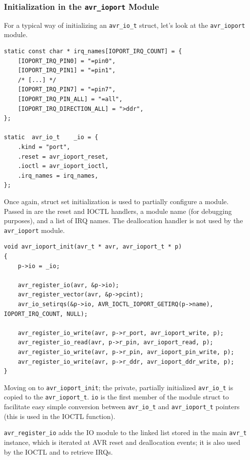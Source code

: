 \subsubsection{Initialization in the \lstinline|avr_ioport| Module}

For a typical way of initializing an \lstinline|avr_io_t| struct, let's look at
the \verb|avr_ioport| module.

\begin{lstlisting}
static const char * irq_names[IOPORT_IRQ_COUNT] = {
    [IOPORT_IRQ_PIN0] = "=pin0",
    [IOPORT_IRQ_PIN1] = "=pin1",
    /* [...] */
    [IOPORT_IRQ_PIN7] = "=pin7",
    [IOPORT_IRQ_PIN_ALL] = "=all",
    [IOPORT_IRQ_DIRECTION_ALL] = ">ddr",
};

static  avr_io_t    _io = {
    .kind = "port",
    .reset = avr_ioport_reset,
    .ioctl = avr_ioport_ioctl,
    .irq_names = irq_names,
};
\end{lstlisting}

Once again, struct set initialization is used to partially configure a module.
Passed in are the reset and \ac{IOCTL} handlers, a module name (for debugging
purposes), and a list of \ac{IRQ} names. The deallocation handler is not used
by the \verb|avr_ioport| module.

\begin{lstlisting}
void avr_ioport_init(avr_t * avr, avr_ioport_t * p)
{
    p->io = _io;

    avr_register_io(avr, &p->io);
    avr_register_vector(avr, &p->pcint);
    avr_io_setirqs(&p->io, AVR_IOCTL_IOPORT_GETIRQ(p->name), IOPORT_IRQ_COUNT, NULL);

    avr_register_io_write(avr, p->r_port, avr_ioport_write, p);
    avr_register_io_read(avr, p->r_pin, avr_ioport_read, p);
    avr_register_io_write(avr, p->r_pin, avr_ioport_pin_write, p);
    avr_register_io_write(avr, p->r_ddr, avr_ioport_ddr_write, p);
}
\end{lstlisting}

Moving on to \lstinline|avr_ioport_init|; the private, partially initialized
\lstinline|avr_io_t| is copied to the \lstinline|avr_ioport_t|. \lstinline|io|
is the first member of the module struct to facilitate easy simple conversion
between \lstinline|avr_io_t| and \lstinline|avr_ioport_t| pointers (this is used
in the \ac{IOCTL} function).

\lstinline|avr_register_io| adds the \ac{IO} module
to the linked list stored in the main \lstinline|avr_t| instance, which is iterated
at \ac{AVR} reset and deallocation events; it is also used by the \ac{IOCTL} and
to retrieve \acp{IRQ}.

